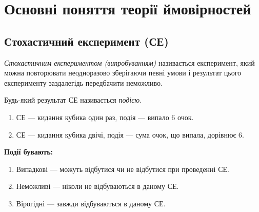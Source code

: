 
\section{Основні поняття теорії ймовірностей}
\subsection*{Стохастичний експеримент (СЕ)}
\begin{definition}
    \emph{Стохастичним експериментом (випробуванням)} називається експеримент, 
    який можна повторювати неодноразово зберігаючи певні умови і результат цього 
    експерименту заздалегідь передбачити неможливо.
\end{definition}
\begin{definition}
    Будь-який результат СЕ називається \emph{подією}.
\end{definition}
\begin{example}
    \begin{enumerate}
        \mbox{}
        \item СЕ --- кидання кубика один раз, подія --- випало 6 очок.
        \item СЕ --- кидання кубика двічі, подія --- сума очок, що випала, дорівнює 6.
    \end{enumerate}
\end{example}

\textbf{Події бувають:}
\begin{enumerate}
    \item Випадкові --- можуть відбутися чи не відбутися при проведенні СЕ.
    \item Неможливі --- ніколи не відбуваються в даному СЕ.
    \item Вірогідні --- завжди відбуваються в даному СЕ.
\end{enumerate}

